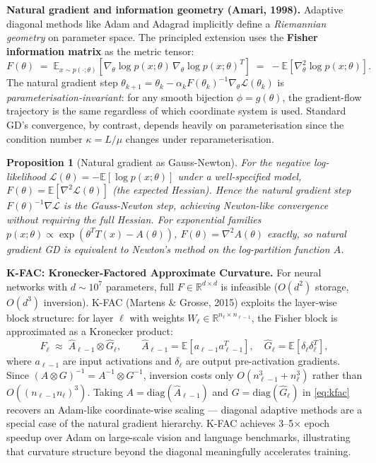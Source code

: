 \documentclass[11pt,a4paper]{article}
\newtheorem{proposition}[theorem]{Proposition}
\theoremstyle{definition}
\begin{document}
\noindent\textbf{Natural gradient and information geometry (Amari, 1998).} Adaptive diagonal methods like Adam and Adagrad implicitly define a \emph{Riemannian geometry} on parameter space. The principled extension uses the \textbf{Fisher information matrix} as the metric tensor:
\begin{equation}
F(\theta) \;=\; \mathbb{E}_{x \sim p(\cdot;\theta)}\!\left[\nabla_\theta \log p(x;\theta)\,\nabla_\theta \log p(x;\theta)^T\right] \;=\; -\mathbb{E}\!\left[\nabla^2_\theta \log p(x;\theta)\right].
\label{eq:fisher_info}
\end{equation}
The natural gradient step $\theta_{k+1} = \theta_k - \alpha_k F(\theta_k)^{-1}\nabla_\theta \mathcal{L}(\theta_k)$ is \emph{parameterisation-invariant}: for any smooth bijection $\phi = g(\theta)$, the gradient-flow trajectory is the same regardless of which coordinate system is used. Standard GD's convergence, by contrast, depends heavily on parameterisation since the condition number $\kappa = L/\mu$ changes under reparameterisation.

\begin{proposition}[Natural gradient as Gauss-Newton]
For the negative log-likelihood $\mathcal{L}(\theta) = -\mathbb{E}[\log p(x;\theta)]$ under a well-specified model, $F(\theta) = \mathbb{E}[\nabla^2\mathcal{L}(\theta)]$ (the expected Hessian). Hence the natural gradient step $F(\theta)^{-1}\nabla\mathcal{L}$ is the \emph{Gauss-Newton step}, achieving Newton-like convergence without requiring the full Hessian. For exponential families $p(x;\theta) \propto \exp(\theta^T T(x) - A(\theta))$, $F(\theta) = \nabla^2 A(\theta)$ exactly, so natural gradient GD is equivalent to Newton's method on the log-partition function $A$.
\end{proposition}

\noindent\textbf{K-FAC: Kronecker-Factored Approximate Curvature.} For neural networks with $d \sim 10^7$ parameters, full $F \in \mathbb{R}^{d\times d}$ is infeasible ($O(d^2)$ storage, $O(d^3)$ inversion). K-FAC (Martens \& Grosse, 2015) exploits the layer-wise block structure: for layer $\ell$ with weights $W_\ell \in \mathbb{R}^{n_\ell \times n_{\ell-1}}$, the Fisher block is approximated as a Kronecker product:
\begin{equation}
F_\ell \;\approx\; \hat{A}_{\ell-1} \otimes \hat{G}_\ell, \qquad \hat{A}_{\ell-1} = \mathbb{E}[a_{\ell-1}a_{\ell-1}^T],\quad \hat{G}_\ell = \mathbb{E}[\delta_\ell \delta_\ell^T],
\label{eq:kfac}
\end{equation}
where $a_{\ell-1}$ are input activations and $\delta_\ell$ are output pre-activation gradients. Since $(A \otimes G)^{-1} = A^{-1} \otimes G^{-1}$, inversion costs only $O(n_{\ell-1}^3 + n_\ell^3)$ rather than $O((n_{\ell-1}n_\ell)^3)$. Taking $A = \text{diag}(\hat{A}_{\ell-1})$ and $G = \text{diag}(\hat{G}_\ell)$ in \eqref{eq:kfac} recovers an Adam-like coordinate-wise scaling — diagonal adaptive methods are a special case of the natural gradient hierarchy. K-FAC achieves 3--5$\times$ epoch speedup over Adam on large-scale vision and language benchmarks, illustrating that curvature structure beyond the diagonal meaningfully accelerates training.
\end{document}
